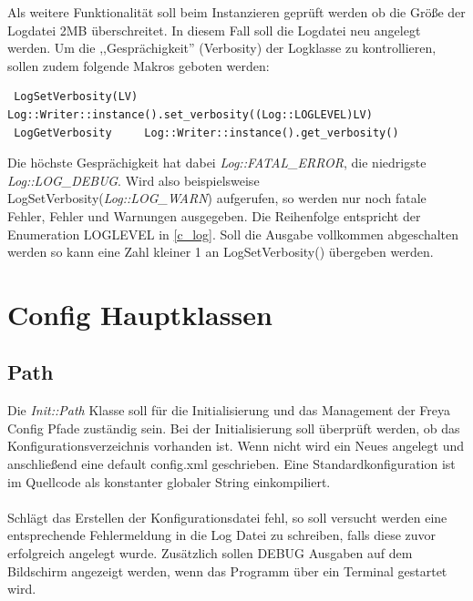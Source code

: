 Als weitere Funktionalität soll beim Instanzieren geprüft werden ob die Größe der Logdatei 2MB überschreitet. In diesem Fall soll die Logdatei neu angelegt werden.
Um die ,,Gesprächigkeit'' (Verbosity) der Logklasse zu kontrollieren, sollen zudem folgende Makros geboten werden:
\begin{verbatim}
 LogSetVerbosity(LV) Log::Writer::instance().set_verbosity((Log::LOGLEVEL)LV)
 LogGetVerbosity     Log::Writer::instance().get_verbosity()
\end{verbatim}
Die höchste Gesprächigkeit hat dabei \emph{Log::FATAL\_ERROR}, die niedrigste \emph{Log::LOG\_DEBUG}. Wird also beispielsweise LogSetVerbosity(\emph{Log::LOG\_WARN}) aufgerufen, so
werden nur noch fatale Fehler, Fehler und Warnungen ausgegeben. Die Reihenfolge entspricht der Enumeration LOGLEVEL in \ref{c_log}.
Soll die Ausgabe vollkommen abgeschalten werden so kann eine Zahl kleiner 1 an LogSetVerbosity() übergeben werden.


\section{Config Hauptklassen}

\subsection{Path}
Die \emph{Init::Path} Klasse soll für die Initialisierung und das Management der Freya Config Pfade zuständig sein.
Bei der Initialisierung soll überprüft werden, ob das Konfigurationsverzeichnis vorhanden ist. Wenn nicht wird ein Neues
angelegt und anschließend eine default config.xml geschrieben. Eine Standardkonfiguration ist im Quellcode als 
konstanter globaler String einkompiliert.
\\
\\
Schlägt das Erstellen der Konfigurationsdatei fehl, so soll versucht werden eine entsprechende Fehlermeldung in die Log Datei zu schreiben, 
falls diese zuvor erfolgreich angelegt wurde. Zusätzlich sollen DEBUG Ausgaben auf dem Bildschirm angezeigt werden, wenn das Programm
über ein Terminal gestartet wird.

